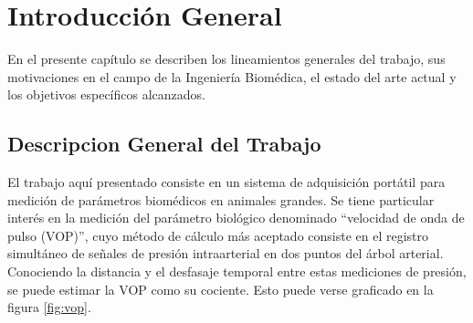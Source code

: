 
\chapter{Introducción General} %

\label{Chapter1} %
\label{IntroGeneral}


\newcommand{\keyword}[1]{\textbf{#1}}
\newcommand{\tabhead}[1]{\textbf{#1}}
\newcommand{\code}[1]{\texttt{#1}}
\newcommand{\file}[1]{\texttt{\bfseries#1}}
\newcommand{\option}[1]{\texttt{\itshape#1}}
\newcommand{\grados}{$^{\circ}$}


En el presente capítulo se describen los lineamientos generales del trabajo, sus motivaciones en el campo de la Ingeniería Biomédica, el estado del arte actual y los objetivos específicos alcanzados.


\section{Descripcion General del Trabajo}

El trabajo aquí presentado consiste en un sistema de adquisición portátil para medición de parámetros biomédicos en animales grandes. Se tiene particular interés en la medición del parámetro biológico denominado \enquote{velocidad de onda de pulso (VOP)}, cuyo método de cálculo más aceptado consiste en el registro simultáneo de señales de presión intraarterial en dos puntos del árbol arterial. Conociendo la distancia y el desfasaje temporal entre estas mediciones de presión, se puede estimar la VOP como su cociente. Esto puede verse graficado en la figura \ref{fig:vop}.

